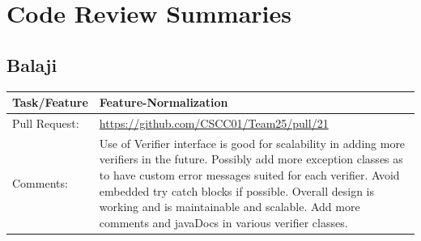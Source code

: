 \documentclass[12pt]{article}
\begin{document}
\section{Code Review Summaries}
\subsection{Balaji} 
\begin{table}[H]
\begin{tabular}{|p{3cm}|p{11cm}|}
\hline
Task/Feature  & Feature-Normalization                                                                                                                                                                                                                                                                                                                                         \\ \hline
Pull Request: & \url{https://github.com/CSCC01/Team25/pull/21}                                                                                                                                                                                                                                                                                                                      \\ \hline
Comments:     & Use of Verifier interface is good for scalability in adding more verifiers in the future. Possibly add more exception classes as to have custom error messages suited for each verifier. Avoid embedded try catch blocks if possible. Overall design is working and is maintainable and scalable. Add more comments and javaDocs in various verifier classes. \\ \hline
\end{tabular}
\end{table}
\end{document}
